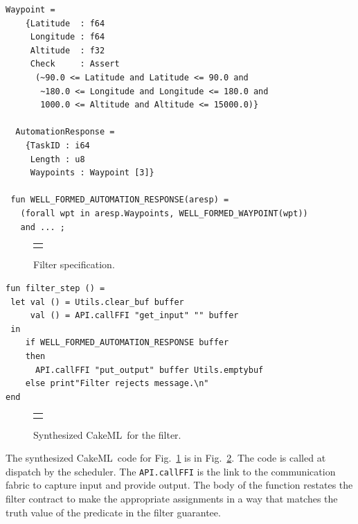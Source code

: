 \documentclass[global,twocolumn]{svjour}
\newcommand{\figref}[1]{Fig.~\ref{#1}}
\newcommand{\ckml}{CakeML}
\begin{document}
\newsavebox{\contig}
\begin{lrbox}{\contig}
\begin{lstlisting}[style=myML]
  Waypoint =
    {Latitude  : f64
     Longitude : f64
     Altitude  : f32
     Check     : Assert
      (~90.0 <= Latitude and Latitude <= 90.0 and
       ~180.0 <= Longitude and Longitude <= 180.0 and
       1000.0 <= Altitude and Altitude <= 15000.0)}

  AutomationResponse =
    {TaskID : i64
     Length : u8
     Waypoints : Waypoint [3]}

 fun WELL_FORMED_AUTOMATION_RESPONSE(aresp) =
   (forall wpt in aresp.Waypoints, WELL_FORMED_WAYPOINT(wpt))
   and ... ;
\end{lstlisting}
\end{lrbox}

\begin{figure}
  \begin{center}
    \begin{tabular}{c}
      \resizebox{\columnwidth}{!}{\usebox{\contig}}
    \end{tabular}
  \end{center}
  \caption{Filter specification.}
  \label{fig:filter-spec}
\end{figure}


\newsavebox{\cml}
\begin{lrbox}{\cml}
\begin{lstlisting}[style=myML]
fun filter_step () =
 let val () = Utils.clear_buf buffer
     val () = API.callFFI "get_input" "" buffer
 in
    if WELL_FORMED_AUTOMATION_RESPONSE buffer
    then
      API.callFFI "put_output" buffer Utils.emptybuf
    else print"Filter rejects message.\n"
end
\end{lstlisting}
\end{lrbox}

\begin{figure}
  \begin{center}
    \begin{tabular}{c}
      \resizebox{\columnwidth}{!}{\usebox{\cml}}
    \end{tabular}
  \end{center}
  \caption{Synthesized \ckml\ for the filter.}
  \label{fig:filter-cakeml}
\end{figure}

The synthesized \ckml\ code for \figref{fig:filter-spec} is in \figref{fig:filter-cakeml}.
%
The code is called at dispatch by the scheduler.
%
The \texttt{API.callFFI} is the link to the communication fabric to capture input and provide output.
%
The body of the function restates the filter contract to make the appropriate assignments in a way that matches the truth value of the predicate in the filter guarantee.
\end{document}
